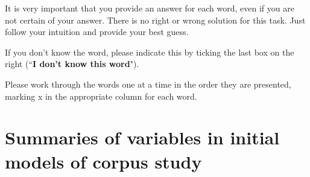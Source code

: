 It is very important that you provide an answer for each word, even if you are not certain of your answer. There is no right or wrong solution for this task. Just follow your intuition and provide your best guess.

If you don’t know the word, please indicate this by ticking the last box on the right (``\textbf{I don't know this word}").

Please work through the words one at a time in the order they are presented, marking x in the appropriate column for each word.



\chapter{Summaries of variables in initial models of corpus study}\label{App B: Summaries of variables in initial models of corpus study}
